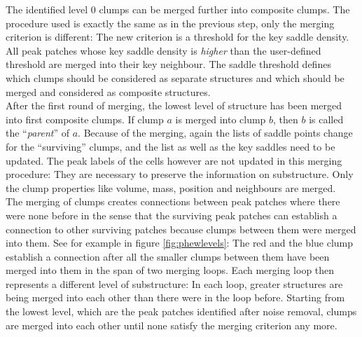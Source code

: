 The identified level 0 clumps can be merged further into composite clumps.
The procedure used is exactly the same as in the previous step, only the merging criterion is different:
The new criterion is a threshold for the key saddle density. All peak patches whose key saddle density is \emph{higher} than the user-defined threshold are merged into their key neighbour.
The saddle threshold defines which clumps should be considered as separate structures and which should be  merged and considered as composite structures.\\
%
After the first round of merging, the lowest level of structure has been merged into first composite clumps.
If clump $a$ is merged into clump $b$, then $b$ is called the ``\emph{parent}'' of $a$.
Because of the merging, again the lists of saddle points change for the ``surviving'' clumps, and the list as well as the key saddles need to be updated.
The peak labels of the cells however are not updated in this merging procedure: 
They are necessary to preserve the information on substructure.
Only the clump properties like volume, mass, position and neighbours are merged.\\
%
The merging of clumps creates connections between peak patches where there were none before in the sense that the surviving peak patches can establish a connection to other surviving patches because clumps between them were merged into them.
See for example in figure \ref{fig:phewlevels}: The red and the blue clump establish a connection after all the smaller clumps between them have been merged into them in the span of two merging loops.
Each merging loop then represents a different level of substructure:
In each loop, greater structures are being merged into each other than there were in the loop before.
Starting from the lowest level, which are the peak patches identified after noise removal, clumps are merged into each other until none satisfy the merging criterion any more.
%

